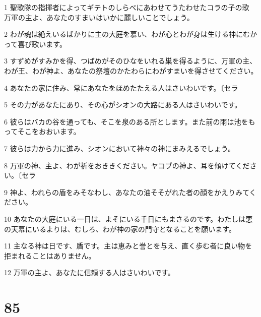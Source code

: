 \par 1 聖歌隊の指揮者によってギテトのしらべにあわせてうたわせたコラの子の歌 万軍の主よ、あなたのすまいはいかに麗しいことでしょう。
\par 2 わが魂は絶えいるばかりに主の大庭を慕い、わが心とわが身は生ける神にむかって喜び歌います。
\par 3 すずめがすみかを得、つばめがそのひなをいれる巣を得るように、万軍の主、わが王、わが神よ、あなたの祭壇のかたわらにわがすまいを得させてください。
\par 4 あなたの家に住み、常にあなたをほめたたえる人はさいわいです。〔セラ
\par 5 その力があなたにあり、その心がシオンの大路にある人はさいわいです。
\par 6 彼らはバカの谷を通っても、そこを泉のある所とします。また前の雨は池をもってそこをおおいます。
\par 7 彼らは力から力に進み、シオンにおいて神々の神にまみえるでしょう。
\par 8 万軍の神、主よ、わが祈をおききください。ヤコブの神よ、耳を傾けてください。〔セラ
\par 9 神よ、われらの盾をみそなわし、あなたの油そそがれた者の顔をかえりみてください。
\par 10 あなたの大庭にいる一日は、よそにいる千日にもまさるのです。わたしは悪の天幕にいるよりは、むしろ、わが神の家の門守となることを願います。
\par 11 主なる神は日です、盾です。主は恵みと誉とを与え、直く歩む者に良い物を拒まれることはありません。
\par 12 万軍の主よ、あなたに信頼する人はさいわいです。

\chapter{85}

